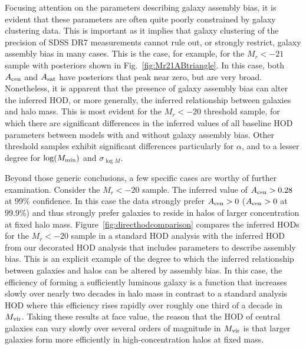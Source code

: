 \documentclass[usenatbib,usegraphicx,letterpaper]{mn2e}
\newcommand{\mvir}{M_{\rm vir}}
\begin{document}
Focusing attention on the parameters describing galaxy assembly bias, it is
evident that these parameters are often quite poorly constrained by galaxy
clustering data. This is important as it implies that galaxy clustering of the precision
of SDSS DR7 measurements cannot rule out, or strongly restrict, galaxy assembly
bias in many cases. This is the case, for example, for the $M_r<-21$ sample with posteriors
shown in Fig.~\ref{fig:Mr21ABtriangle}. In this case, both $A_{\rm cen}$ and
$A_{\rm sat}$ have posteriors that peak near zero, but are very broad.
Nonetheless, it is apparent that the presence of galaxy assembly bias
can alter the inferred HOD, or more generally, the inferred relationship between
galaxies and halo mass. This is most evident for the $M_r < -20$ threshold sample,
for which there are significant differences in the inferred values of all baseline HOD
parameters between models with and without galaxy assembly bias. Other threshold
samples exhibit significant differences particularly for $\alpha$, and to a lesser degree
for $\log (M_{\rm min})$ and $\sigma_{\log M}$.


Beyond those generic conclusions, a few specific cases are worthy of further examination.
Consider the $M_r < -20$ sample. The inferred value of $A_{\rm cen} > 0.28$ at 99\%
confidence. In this case the data strongly prefer $A_{\rm cen} > 0$ ($A_{\rm cen} > 0$ at $99.9\%$) 
and thus strongly prefer galaxies to reside in halos of larger concentration at fixed halo mass. Figure~\ref{fig:directhodcomparison}
compares the inferred HODs for the $M_r<-20$ sample in a standard HOD analysis with the
inferred HOD from our decorated HOD analysis that includes parameters to describe
assembly bias. This is an explicit example of the degree to which the inferred relationship
between galaxies and halos can be altered by assembly bias. In this case, the efficiency 
of forming a sufficiently luminous galaxy is a function that increases slowly over nearly two 
decades in halo mass in contrast to a standard analysis HOD where this efficiency rises 
rapidly over roughly one third of a decade in $\mvir$. Taking these results at face value, 
the reason that the HOD of central galaxies can vary slowly over several orders of magnitude 
in $\mvir$ is that larger galaxies form more efficiently in high-concentration halos at fixed 
mass. 
\end{document}
